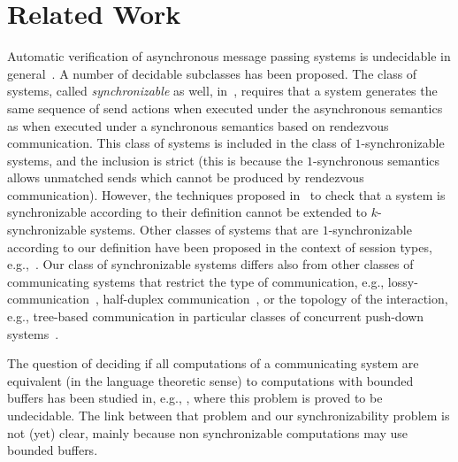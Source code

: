 \section{Related Work}\label{sec:related}

Automatic verification of asynchronous message passing systems is undecidable in general~\cite{DBLP:journals/jacm/BrandZ83}. 
A number of decidable subclasses has been proposed. 
The class of systems, called \emph{synchronizable} as well, in~\cite{DBLP:journals/tcs/BasuB16}, requires that a system generates the same sequence of send actions when executed under the asynchronous semantics as when executed under a synchronous semantics based on rendezvous communication. This class of systems is included in the class of $1$-synchronizable systems, and the inclusion is strict (this is because the $1$-synchronous semantics allows unmatched sends which cannot be produced by rendezvous communication). However, the techniques proposed in~\cite{DBLP:journals/tcs/BasuB16} to check that a system is synchronizable according to their definition cannot be extended to $k$-synchronizable systems.
Other classes of systems that are $1$-synchronizable according to our definition have been proposed in the context of session types, e.g.,~\cite{DBLP:conf/esop/DenielouY12,DBLP:journals/jacm/HondaYC16,DBLP:conf/esop/HondaVK98,DBLP:conf/popl/LangeTY15}. 
Our class of synchronizable systems differs also from other classes of communicating systems that restrict the type of communication, e.g., lossy-communication~\cite{DBLP:journals/iandc/AbdullaJ96}, half-duplex communication~\cite{DBLP:journals/iandc/CeceF05}, or the topology of the interaction, e.g., tree-based communication in particular classes of concurrent push-down systems~\cite{DBLP:conf/tacas/TorreMP08,DBLP:journals/corr/abs-1209-0359}.

The question of deciding if all computations of a communicating system are equivalent (in the language theoretic sense) to computations with bounded buffers has been studied in, e.g., \cite{DBLP:journals/fuin/GenestKM07}, where this problem is proved to be undecidable. The link between that problem and our synchronizability problem is not (yet) clear, mainly because non synchronizable computations may use bounded buffers.

